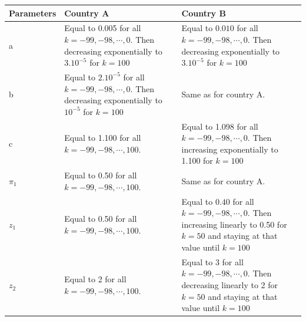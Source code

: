 \begin{table}[tbh]

\begin{center}
    \label{parameters_table}
    \begin{tabular}{ | l | l |  p{5cm}|}
    \hline
    Parameters & Country A  & Country B \\ 
    \hline
    a &\multicolumn{1}{m{4cm}|}{Equal to 0.005 for all  $k=-99, -98, \cdots, 0$.  Then decreasing exponentially to $3.10^{-5}$ for $k = 100$}& \multicolumn{1}{m{4cm}|}{ Equal to $0.010$ for all $k=-99, -98,\cdots, 0$. Then decreasing exponentially to $3.10^{-5}$ for  $k = 100$} \\ 
    \hline
    b &\multicolumn{1}{m{4cm}|}{Equal to $2.10^{-5}$ for all $k=-99, -98, \cdots, 0$.  Then decreasing exponentially to $10^{-5}$ for $k = 100$}& Same as for country A. \\ 
    \hline
    c & \multicolumn{1}{m{4cm}|}{Equal to 1.100 for all $k=-99, -98, \cdots, 100$.} & \multicolumn{1}{m{4cm}|}{ Equal to 1.098 for all $k=-99, -98,\cdots, 0$. Then increasing exponentially to 1.100 for  $k = 100$} \\  
    \hline
    $\pi_{1}$ &\multicolumn{1}{m{4cm}|}{Equal to 0.50 for all $k=-99, -98, \cdots, 100$.}& Same as for country A.\\  
    \hline
    $z_{1}$  &\multicolumn{1}{m{4cm}|}{Equal to 0.50 for all $k=-99, -98, \cdots, 100$.}& \multicolumn{1}{m{4cm}|}{ Equal to $0.40$ for all $k=-99,-98, \cdots, 0$. Then increasing linearly to 0.50 for  $k = 50$ and staying at that value until $k = 100$} \\ 
    \hline
    $z_{2}$ &\multicolumn{1}{m{4cm}|}{Equal to 2 for all $k=-99, -98, \cdots, 100$.}& \multicolumn{1}{m{4cm}|}{ Equal to 3 for all $k=-99, -98,\cdots, 0$. Then decreasing linearly to 2 for  $k = 50$ and staying at that value until $k = 100$} \\ 
    \hline
    \end{tabular}
\end{center}

\end{table}



